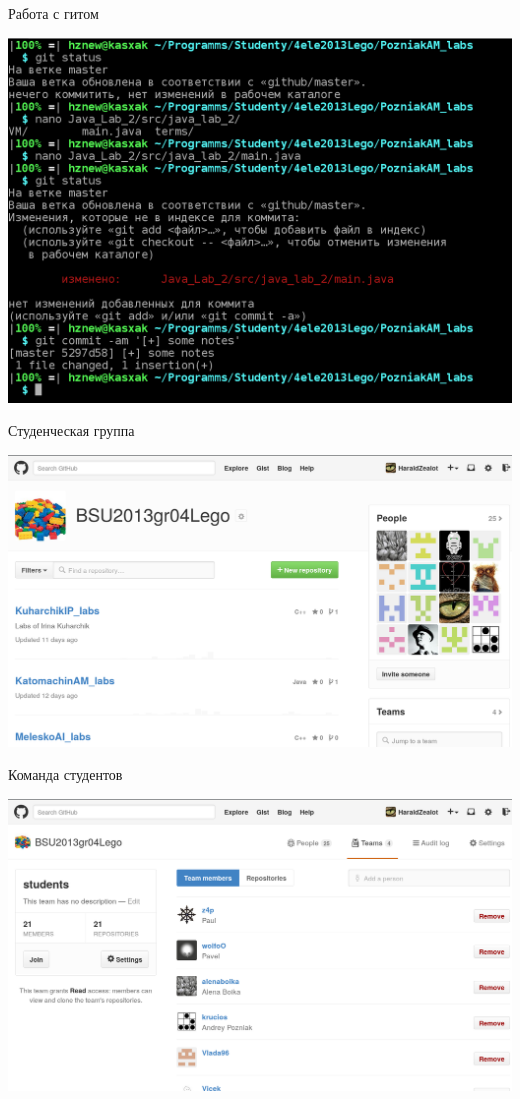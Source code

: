 \documentclass[xetex,14pt,serif,compress,hyperref={xetex}]{beamer}
\begin{document}
\begin{frame}{Работа с гитом}
\begin{center}
\includegraphics[scale=0.5,keepaspectratio]{snp37.png}
\end{center}
\end{frame}

\begin{frame}{Студенческая группа}
\begin{center}
\includegraphics[scale=0.4,keepaspectratio]{snp39.png}
\end{center}
\end{frame}

\begin{frame}{Команда студентов}
\begin{center}
\includegraphics[scale=0.4,keepaspectratio]{snp40.png}
\end{center}
\end{frame}
\end{document}
